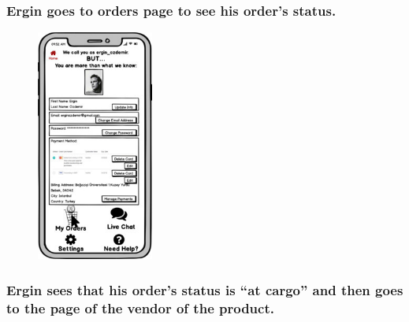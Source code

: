 \documentclass[]{article}
\begin{document}
\hypertarget{ergin-goes-to-orders-page-to-see-his-orders-status.}{%
    \subsubsection{Ergin goes to orders page to see his order's
        status.}\label{ergin-goes-to-orders-page-to-see-his-orders-status.}}

\begin{figure}[H]
    \centering
    \includegraphics[height=3in]{./images/14.jpg}
\end{figure}

\hypertarget{ergin-sees-that-his-orders-status-is-at-cargo-and-then-goes-to-the-page-of-the-vendor-of-the-product.}{%
    \subsubsection{Ergin sees that his order's status is ``at cargo'' and
        then goes to the page of the vendor of the
        product.}\label{ergin-sees-that-his-orders-status-is-at-cargo-and-then-goes-to-the-page-of-the-vendor-of-the-product.}}
\end{document}
